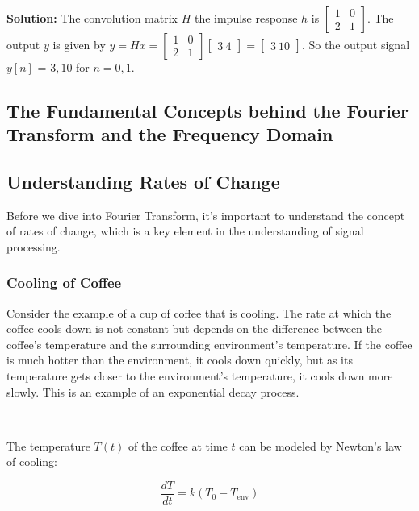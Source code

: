 \documentclass[11pt]{article}
\begin{document}
\ 


\noindent \textbf{Solution:} The convolution matrix $H$ \for the impulse response $h$ is $\begin{bmatrix} 1 & 0 \\ 2 & 1 \end{bmatrix}$. The output $y$ is given by $y = Hx = \begin{bmatrix} 1 & 0 \\ 2 & 1 \end{bmatrix} \begin{bmatrix} 3 \ 4 \end{bmatrix} = \begin{bmatrix} 3 \ 10 \end{bmatrix}$. So the output signal $y[n]$ = ${3, 10}$ for $n = {0, 1}$.






\subsection*{The Fundamental Concepts behind the Fourier Transform and the Frequency Domain}

\subsection*{Understanding Rates of Change}

Before we dive into Fourier Transform, it's important to understand the concept of rates of change, which is a key element in the understanding of signal processing. 

\subsubsection*{Cooling of Coffee}

Consider the example of a cup of coffee that is cooling. The rate at which the coffee cools down is not constant but depends on the difference between the coffee's temperature and the surrounding environment's temperature. If the coffee is much hotter than the environment, it cools down quickly, but as its temperature gets closer to the environment's temperature, it cools down more slowly. This is an example of an exponential decay process.

\ 

The temperature $T(t)$ of the coffee at time $t$ can be modeled by Newton's law of cooling:

\[\frac{dT}{dt} = k  (T_0 - T_{\text{env}}) \]
\end{document}
